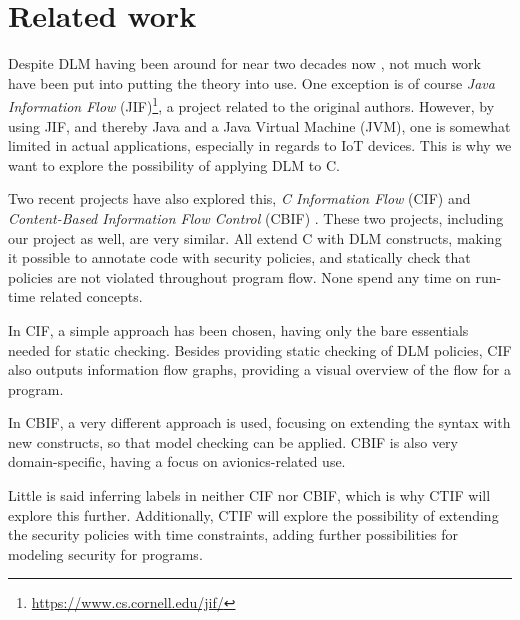 
\section{Related work}
Despite DLM having been around for near two decades now \cite{myers1997}, not much work have been put into putting the theory into use.
One exception is of course \emph{Java Information Flow} (JIF)\footnote{\url{https://www.cs.cornell.edu/jif/}}, a project related to the original authors.
However, by using JIF, and thereby Java and a Java Virtual Machine (JVM), one is somewhat limited in actual applications, especially in regards to IoT devices.
This is why we want to explore the possibility of applying DLM to C.

Two recent projects have also explored this, \emph{C Information Flow} (CIF) \cite{muller2015cif} and \emph{Content-Based Information Flow Control} (CBIF) \cite{maciazek2016cbif}.
These two projects, including our project as well, are very similar.
All extend C with DLM constructs, making it possible to annotate code with security policies, and statically check that policies are not violated throughout program flow.
None spend any time on run-time related concepts.

In CIF, a simple approach has been chosen, having only the bare essentials needed for static checking.
Besides providing static checking of DLM policies, CIF also outputs information flow graphs, providing a visual overview of the flow for a program.

In CBIF, a very different approach is used, focusing on extending the syntax with new constructs, so that model checking can be applied.
CBIF is also very domain-specific, having a focus on avionics-related use.

Little is said inferring labels in neither CIF nor CBIF, which is why CTIF will explore this further.
Additionally, CTIF will explore the possibility of extending the security policies with time constraints, adding further possibilities for modeling security for programs.
